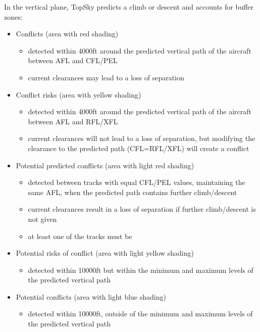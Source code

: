 \documentclass[a4paper,oneside,11pt]{memoir}
\begin{document}
\bigskip

In the vertical plane, TopSky predicts a climb or descent and accounts for buffer zones:


\begin{itemize}
    \item Conflicts (area with red shading)
    \begin{itemize}
        \item detected within 4000ft around the predicted vertical path of the aircraft between AFL and CFL/PEL
        \item current clearances may lead to a loss of separation
    \end{itemize}
    \item Conflict risks (area with yellow shading)
    \begin{itemize}
        \item detected within 4000ft around the predicted vertical path of the aircraft between AFL and RFL/XFL
        \item current clearances will not lead to a loss of separation, but modifying the clearance to the predicted path (CFL=RFL/XFL) will create a conflict
    \end{itemize}
    \item Potential predicted conflicts (area with light red shading)
    \begin{itemize}
        \item detected between tracks with equal CFL/PEL values, maintaining the same AFL, when the predicted path contains further climb/descent
        \item current clearances result in a loss of separation if further climb/descent is not given
        \item at least one of the tracks must be 
    \end{itemize}
    \item Potential risks of conflict (area with light yellow shading)
    \begin{itemize}
        \item detected within 10000ft but within the minimum and maximum levels of the predicted vertical path
    \end{itemize}
    \item Potential conflicts (area with light blue shading)
    \begin{itemize}
        \item detected within 10000ft, outside of the minimum and maximum levels of the predicted vertical path
    \end{itemize}
\end{itemize}
\end{document}
